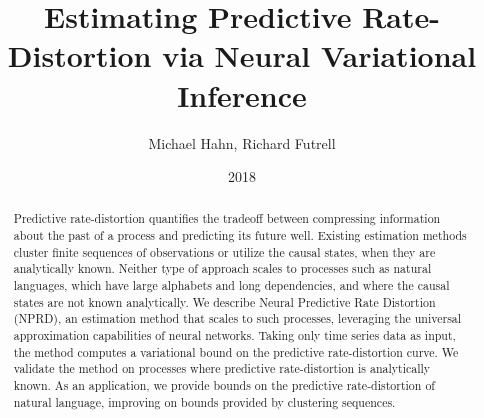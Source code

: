 \documentclass[11pt,letterpaper]{article}
\author{Michael Hahn, Richard Futrell}
\title{Estimating Predictive Rate-Distortion via Neural Variational Inference}
\date{2018}
\begin{document}
\maketitle




\begin{abstract}
Predictive rate-distortion quantifies the tradeoff between compressing information about the past of a process and predicting its future well.
Existing estimation methods cluster finite sequences of observations or utilize the causal states, when they are analytically known.
Neither type of approach scales to processes such as natural languages, which have large alphabets and long dependencies, and where the causal states are not known analytically.
	We describe Neural Predictive Rate Distortion (NPRD), an estimation method that scales to such processes, leveraging the universal approximation capabilities of neural networks.
Taking only time series data as input, the method computes a variational bound on the predictive rate-distortion curve.
We validate the method on processes where predictive rate-distortion is analytically known.
As an application, we provide bounds on the predictive rate-distortion of natural language, improving on bounds provided by clustering sequences.
\end{abstract}
\end{document}
